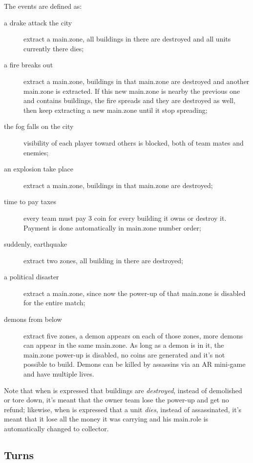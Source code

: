 			The events are defined as:
			\begin{description}
				\item[a drake attack the city] extract a main.zone, all buildings in there are destroyed and all units currently there dies;
				\item[a fire breaks out] extract a main.zone, buildings in that main.zone are destroyed and another main.zone is extracted. If this new main.zone is nearby the previous one and contains buildings, the fire spreads and they are destroyed as well, then keep extracting a new main.zone until it stop spreading;
				\item[the fog falls on the city] visibility of each player toward others is blocked, both of team mates and enemies;
				\item[an explosion take place] extract a main.zone, buildings in that main.zone are destroyed;
				\item[time to pay taxes] every team must pay 3 coin for every building it owns or destroy it. Payment is done automatically in main.zone number order;
				\item[suddenly, earthquake] extract two zones, all building in there are destroyed;
				\item[a political disaster] extract a main.zone, since now the power-up of that main.zone is disabled for the entire match;
				\item[demons from below] extract five zones, a demon appears on each of those zones, more demons can appear in the same main.zone. As long as a demon is in it, the main.zone power-up is disabled, no coins are generated and it's not possible to build. Demons can be killed by assassins via an AR mini-game and have multiple lives.
			\end{description}
			
			Note that when is expressed that buildings are \emph{destroyed}, instead of demolished or tore down, it's meant that the owner team lose the power-up and get no refund; likewise, when is expressed that a unit \emph{dies}, instead of assassinated, it's meant that it lose all the money it was carrying and his main.role is automatically changed to collector.
			
			
		\subsection{Turns}
		
